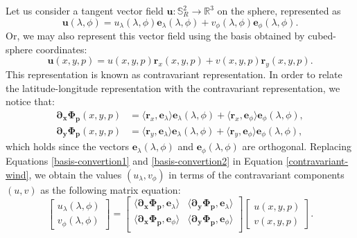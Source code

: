 Let us consider a tangent vector field $\boldsymbol{u}: \mathbb{S}^2_R \to 
\mathbb{R}^3$ on the sphere, represented as
\begin{equation}
	\label{latlon-wind}
	\boldsymbol{u}(\lambda, \phi) = 
	u_{\lambda} (\lambda, \phi) \boldsymbol{e}_{\lambda} (\lambda, \phi) + 
	v_{\phi} (\lambda, \phi) \boldsymbol{e}_{\phi} (\lambda, \phi). 
\end{equation}
Or, we may also represent this vector field using the basis 
obtained by cubed-sphere coordinates:
\begin{equation}
	\label{contravariant-wind}
	\boldsymbol{u}(x, y, p) = 
	{u}(x, y, p) \boldsymbol{r}_{x}(x, y, p) + 
	{v}(x, y, p) \boldsymbol{r}_{y}(x, y, p).
\end{equation}
This representation is known as contravariant representation.
In order to relate the latitude-longitude representation
with the contravariant representation, we notice that:
\begin{align}
	\label{basis-convertion1}
	\boldsymbol{\partial_x \Phi_p}(x, y, p) &= 
	\langle \boldsymbol{r}_{x} , \boldsymbol{e}_{\lambda}\rangle
	\boldsymbol{e}_{\lambda} (\lambda, \phi)  
	+ \langle \boldsymbol{r}_{x} , \boldsymbol{e}_{\phi}\rangle
	\boldsymbol{e}_{\phi} (\lambda, \phi), \\
	\label{basis-convertion2}
	\boldsymbol{\partial_y \Phi_p}(x, y, p) &=  
	\langle \boldsymbol{r}_{y} , \boldsymbol{e}_{\lambda}\rangle
	\boldsymbol{e}_{\lambda} (\lambda, \phi) 
	+ \langle \boldsymbol{r}_{y} , \boldsymbol{e}_{\phi}\rangle
	\boldsymbol{e}_{\phi} (\lambda, \phi), 
\end{align}
which holds since the vectors $\boldsymbol{e}_{\lambda}(\lambda, \phi)$ and
$\boldsymbol{e}_{\phi}(\lambda, \phi)$ are orthogonal.
Replacing Equations \eqref{basis-convertion1} and \eqref{basis-convertion2}
in Equation \eqref{contravariant-wind}, we obtain the values $(u_\lambda, v_\phi)$
in terms of the contravariant components $({u},{v})$ 
as the following matrix equation:
\begin{equation}
	\label{ll-to-contravariant}
	\begin{bmatrix}
		u_\lambda (\lambda, \phi) \\
		v_\phi (\lambda, \phi) 
	\end{bmatrix}
	=
	\begin{bmatrix}
		\langle \boldsymbol{\partial_x \Phi_p}, \boldsymbol{e}_\lambda \rangle 
		& \langle \boldsymbol{\partial_y \Phi_p}, \boldsymbol{e}_\lambda \rangle \\
		\langle \boldsymbol{\partial_x \Phi_p}, \boldsymbol{e}_\phi \rangle 
		& \langle \boldsymbol{\partial_y \Phi_p}, \boldsymbol{e}_\phi \rangle \\
	\end{bmatrix}
	\begin{bmatrix}
		{u}(x,y,p) \\
		{v}(x,y,p)
	\end{bmatrix}.
\end{equation}
